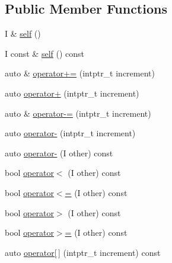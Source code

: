 \subsection*{Public Member Functions}
\begin{DoxyCompactItemize}
\item 
I \& \mbox{\hyperlink{structrah_1_1iterator__facade_3_01_i_00_01_r_00_01std_1_1random__access__iterator__tag_01_4_af615854ffd8e6fee76b721b22082083a}{self}} ()
\item 
I const  \& \mbox{\hyperlink{structrah_1_1iterator__facade_3_01_i_00_01_r_00_01std_1_1random__access__iterator__tag_01_4_a166a2cf8556d9ceab0f13c25a8479d68}{self}} () const
\item 
auto \& \mbox{\hyperlink{structrah_1_1iterator__facade_3_01_i_00_01_r_00_01std_1_1random__access__iterator__tag_01_4_a57ed10cbef4737afed6fe528153242d4}{operator+=}} (intptr\+\_\+t increment)
\item 
auto \mbox{\hyperlink{structrah_1_1iterator__facade_3_01_i_00_01_r_00_01std_1_1random__access__iterator__tag_01_4_a83aedd8f19e900b6e88738983019d397}{operator+}} (intptr\+\_\+t increment)
\item 
auto \& \mbox{\hyperlink{structrah_1_1iterator__facade_3_01_i_00_01_r_00_01std_1_1random__access__iterator__tag_01_4_afb47b6bc9a78b8ada27a9e6762490509}{operator-\/=}} (intptr\+\_\+t increment)
\item 
auto \mbox{\hyperlink{structrah_1_1iterator__facade_3_01_i_00_01_r_00_01std_1_1random__access__iterator__tag_01_4_aee5b793dd95cd2982ac0308525b9a7dd}{operator-\/}} (intptr\+\_\+t increment)
\item 
auto \mbox{\hyperlink{structrah_1_1iterator__facade_3_01_i_00_01_r_00_01std_1_1random__access__iterator__tag_01_4_ae8ed48020abfa623caadbd66250709e8}{operator-\/}} (I other) const
\item 
bool \mbox{\hyperlink{structrah_1_1iterator__facade_3_01_i_00_01_r_00_01std_1_1random__access__iterator__tag_01_4_a66e4bfae3597e0979bac8e8c01f2ea1d}{operator$<$}} (I other) const
\item 
bool \mbox{\hyperlink{structrah_1_1iterator__facade_3_01_i_00_01_r_00_01std_1_1random__access__iterator__tag_01_4_ae4083d1a2e06f942cc4c3dd9c9e6b253}{operator$<$=}} (I other) const
\item 
bool \mbox{\hyperlink{structrah_1_1iterator__facade_3_01_i_00_01_r_00_01std_1_1random__access__iterator__tag_01_4_ae540df5bae946be7133f516ac9b086f6}{operator$>$}} (I other) const
\item 
bool \mbox{\hyperlink{structrah_1_1iterator__facade_3_01_i_00_01_r_00_01std_1_1random__access__iterator__tag_01_4_a93a69c815419553734a4acecba4b570c}{operator$>$=}} (I other) const
\item 
auto \mbox{\hyperlink{structrah_1_1iterator__facade_3_01_i_00_01_r_00_01std_1_1random__access__iterator__tag_01_4_af373e99fe3b17367745f6c5543502df2}{operator\mbox{[}$\,$\mbox{]}}} (intptr\+\_\+t increment) const
\end{DoxyCompactItemize}


